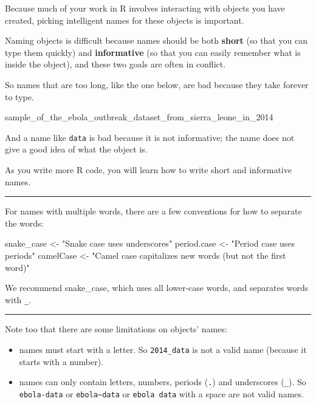 \documentclass[
  letterpaper,
  DIV=11,
  numbers=noendperiod]{scrreprt}
\newenvironment{Shaded}{\begin{snugshade}}{\end{snugshade}}
\newcommand{\NormalTok}[1]{\textcolor[rgb]{0.00,0.23,0.31}{#1}}
\newcommand{\OtherTok}[1]{\textcolor[rgb]{0.00,0.23,0.31}{#1}}
\newcommand{\StringTok}[1]{\textcolor[rgb]{0.13,0.47,0.30}{#1}}
\begin{document}
Because much of your work in R involves interacting with objects you
have created, picking intelligent names for these objects is important.

Naming objects is difficult because names should be both \textbf{short}
(so that you can type them quickly) and \textbf{informative} (so that
you can easily remember what is inside the object), and these two goals
are often in conflict.

So names that are too long, like the one below, are bad because they
take forever to type.

\begin{Shaded}
\begin{Highlighting}[]
\NormalTok{sample\_of\_the\_ebola\_outbreak\_dataset\_from\_sierra\_leone\_in\_2014}
\end{Highlighting}
\end{Shaded}

And a name like \texttt{data} is bad because it is not informative; the
name does not give a good idea of what the object is.

As you write more R code, you will learn how to write short and
informative names.

\begin{center}\rule{0.5\linewidth}{0.5pt}\end{center}

For names with multiple words, there are a few conventions for how to
separate the words:

\begin{Shaded}
\begin{Highlighting}[]
\NormalTok{snake\_case }\OtherTok{\textless{}{-}} \StringTok{"Snake case uses underscores"}
\NormalTok{period.case }\OtherTok{\textless{}{-}} \StringTok{"Period case uses periods"}
\NormalTok{camelCase }\OtherTok{\textless{}{-}} \StringTok{"Camel case capitalizes new words (but not the first word)"}
\end{Highlighting}
\end{Shaded}

We recommend snake\_case, which uses all lower-case words, and separates
words with \texttt{\_}.

\begin{center}\rule{0.5\linewidth}{0.5pt}\end{center}

Note too that there are some limitations on objects' names:

\begin{itemize}
\item
  names must start with a letter. So \texttt{2014\_data} is not a valid
  name (because it starts with a number).
\item
  names can only contain letters, numbers, periods (\texttt{.}) and
  underscores (\texttt{\_}). So \texttt{ebola-data} or
  \texttt{ebola\textasciitilde{}data} or \texttt{ebola\ data} with a
  space are not valid names.
\end{itemize}
\end{document}
